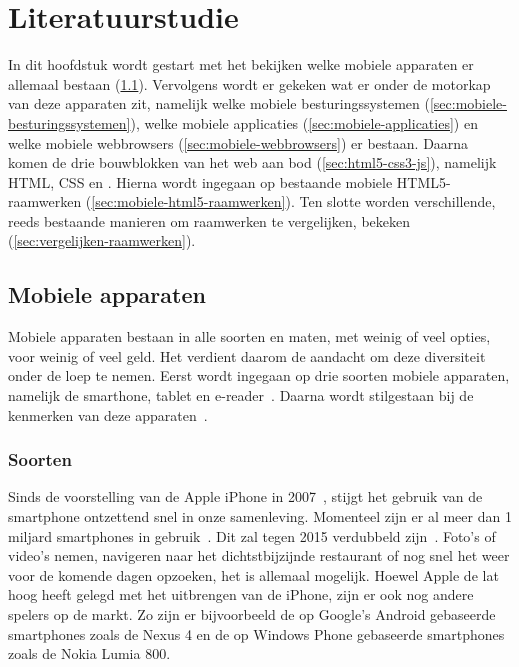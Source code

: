 \chapter{Literatuurstudie}
\label{chap:literatuurstudie}
In dit hoofdstuk wordt gestart met het bekijken welke mobiele apparaten er allemaal bestaan (\ref{sec:mobiele-apparaten}). 
Vervolgens wordt er gekeken wat er onder de motorkap van deze apparaten zit, namelijk welke mobiele besturingssystemen (\ref{sec:mobiele-besturingssystemen}), welke mobiele applicaties (\ref{sec:mobiele-applicaties}) en welke mobiele webbrowsers (\ref{sec:mobiele-webbrowsers}) er bestaan. 
Daarna komen de drie bouwblokken van het web aan bod (\ref{sec:html5-css3-js}), namelijk HTML, CSS en \js{}.
Hierna wordt ingegaan op bestaande mobiele HTML5-raamwerken (\ref{sec:mobiele-html5-raamwerken}).  
Ten slotte worden verschillende, reeds bestaande manieren om raamwerken te vergelijken, bekeken (\ref{sec:vergelijken-raamwerken}).


\section{Mobiele apparaten}
\label{sec:mobiele-apparaten}
Mobiele apparaten bestaan in alle soorten en maten, met weinig of veel opties, voor weinig of veel geld. 
Het verdient daarom de aandacht om deze diversiteit onder de loep te nemen. 
Eerst wordt ingegaan op drie soorten mobiele apparaten, namelijk de smarthone, tablet en e-reader~\cite{GCF2013}.
Daarna wordt stilgestaan bij de kenmerken van deze apparaten~\cite{PhilDutson2012}.

\subsection{Soorten}
Sinds de voorstelling van de Apple iPhone in 2007~\cite{David2011}, stijgt het gebruik van de smartphone ontzettend snel in onze samenleving.  
Momenteel zijn er al meer dan 1 miljard smartphones in gebruik~\cite{Yang2012}. 
Dit zal tegen 2015 verdubbeld zijn~\cite{Gillett2012}.
Foto's of video's nemen, navigeren naar het dichtstbijzijnde restaurant of nog snel het weer voor de komende dagen opzoeken, het is allemaal mogelijk. 
Hoewel Apple de lat hoog heeft gelegd met het uitbrengen van de iPhone, zijn er ook nog andere spelers op de markt. 
Zo zijn er bijvoorbeeld de op Google's Android gebaseerde smartphones zoals de Nexus 4 en de op Windows Phone gebaseerde smartphones zoals de Nokia Lumia 800.

